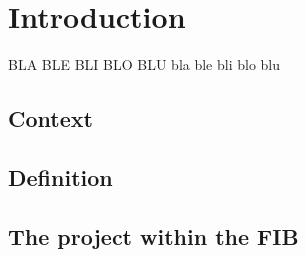 \chapter{Introduction} %
\label{Chapter1Introduction} %


BLA BLE BLI BLO BLU
bla ble bli blo blu

\section{Context}
\label{Introduction::Context}


\section{Definition}
\label{Introduction::Definition}


\section{The project within the FIB}
\label{Introduction::FIB}

